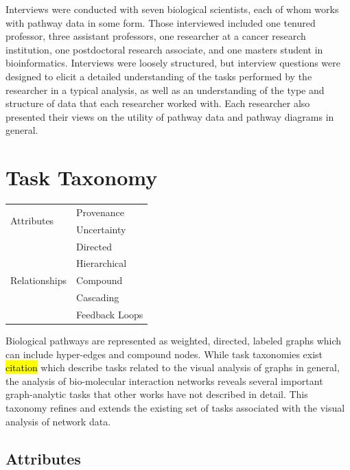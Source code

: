 Interviews were conducted with seven biological scientists, each of whom works with pathway data in some form.
Those interviewed included one tenured professor, three assistant professors, one researcher at a cancer research institution, one postdoctoral research associate, and one masters student in bioinformatics.
Interviews were loosely structured, but interview questions were designed to elicit a detailed understanding of the tasks performed by the researcher in a typical analysis, as well as an understanding of the type and structure of data that each researcher worked with.
Each researcher also presented their views on the utility of pathway data and pathway diagrams in general.

\section{Task Taxonomy}

\begin{table}
  \begin{tabular}{| l | l |}
    \hline
    \multirow{2}{*}{Attributes} & Provenance \\
    & Uncertainty \\ \hline
    \multirow{5}{*}{Relationships} & Directed \\
    & Hierarchical \\
    & Compound \\
    & Cascading \\
    & Feedback Loops \\ \hline
  \end{tabular}
\end{table}


Biological pathways are represented as weighted, directed, labeled graphs which can include hyper-edges and compound nodes.
While task taxonomies exist \hl{citation} which describe tasks related to the visual analysis of graphs in general, the analysis of bio-molecular interaction networks reveals several important graph-analytic tasks that other works have not described in detail. This taxonomy refines and extends the existing set of tasks associated with the visual analysis of network data.

\subsection{Attributes}

